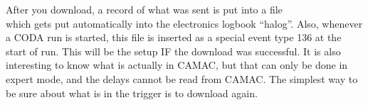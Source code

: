 {\par

After you download, a record of what was sent is put into a file \\ 
which gets put automatically into the electronics 
logbook ``halog''.   Also, whenever a CODA run is 
started, this file is inserted as a special event 
type 136 at the start of run.   This will be the 
setup IF the download was successful.   It is also 
interesting to know what is actually in CAMAC, but 
that can only be done in expert mode, and the delays
cannot be read from CAMAC.
The simplest way to be sure about what is in the 
trigger is to download again. 

}

%
%
%
%
%
